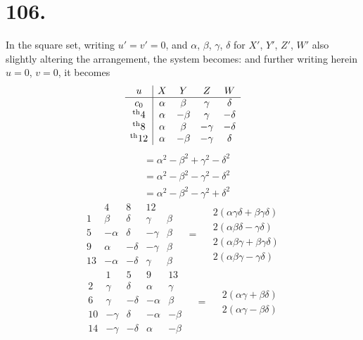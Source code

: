 \documentclass[11pt,a4paper]{book}
\providecommand{\uth}{\textsuperscript{th}}
\begin{document}
\newpage
\section*{106.}
\label{sec:106}

In the square set, writing $u' = v' = 0$, and $\alpha$, $\beta$, $\gamma$, $\delta$ for $X'$, $Y'$, $Z'$, $W'$ also slightly altering the arrangement, the system becomes: and further writing herein $u = 0$, $v = 0$, it becomes
\[
\begin{array}{c|cccc}
u & X & Y & Z & W \\
\hline
c_0 & \alpha & \beta & \gamma & \delta \\
\uth{4} & \alpha & -\beta & \gamma & -\delta \\
\uth{8} & \alpha & \beta & -\gamma & -\delta \\
\uth{12} & \alpha & -\beta & -\gamma & \delta
\end{array}
\]
\[
\begin{array}{c|c}
& = \alpha^2 - \beta^2 + \gamma^2 - \delta^2 \\
& = \alpha^2 - \beta^2 - \gamma^2 - \delta^2 \\
& = \alpha^2 - \beta^2 - \gamma^2 + \delta^2
\end{array}
\]
\[
\begin{array}{c|cccc}
& 4 & 8 & 12 & \\
\hline
1 & \beta & \delta & \gamma & \beta \\
5 & -\alpha & \delta & -\gamma & \beta \\
9 & \alpha & -\delta & -\gamma & \beta \\
13 & -\alpha & -\delta & \gamma & \beta
\end{array}
\quad = \quad
\begin{array}{l}
2(\alpha\gamma\delta + \beta\gamma\delta) \\
2(\alpha\beta\delta - \gamma\delta) \\
2(\alpha\beta\gamma + \beta\gamma\delta) \\
2(\alpha\beta\gamma - \gamma\delta)
\end{array}
\]
\[
\begin{array}{c|cccc}
& 1 & 5 & 9 & 13 \\
\hline
2 & \gamma & \delta & \alpha & \gamma \\
6 & \gamma & -\delta & -\alpha & \beta \\
10 & -\gamma & \delta & -\alpha & -\beta \\
14 & -\gamma & -\delta & \alpha & -\beta
\end{array}
\quad = \quad
\begin{array}{l}
2(\alpha\gamma + \beta\delta) \\
2(\alpha\gamma - \beta\delta)
\end{array}
\]
\end{document}
